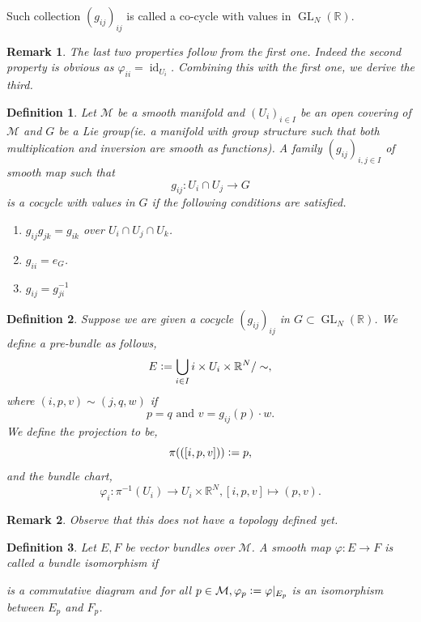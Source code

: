 \documentclass[8pt]{article}
\newtheorem{definition}{Definition}[section]
\newtheorem{remark}{Remark}[section]
\DeclareMathOperator{\GL}{GL}
\DeclareMathOperator{\id}{id}
\newcommand{\defeq}{\vcentcolon=}
\newcommand{\R}[0]{\mathbb{R}}
\newcommand{\M}[0]{\mathcal{M}}
\begin{document}
  Such collection $(g_{ij})_{ij}$ is called a co-cycle with values in $\GL_N(\R)$.
  \begin{remark}
    The last two properties follow from the first one. Indeed the second property is obvious as $\varphi_{ii} = \id_{U_i}$. Combining this with the first one, we derive the third.
  \end{remark}
  \begin{definition}
    Let $\M$ be a smooth manifold and $(U_i)_{i\in I}$ be an open covering of $\M$ and $G$ be a Lie group(ie. a manifold with group structure such that both multiplication and inversion are smooth as functions). A family $(g_{ij})_{i,j\in I}$ of smooth map such that 
    \begin{equation*}
      g_{ij}:U_i\cap U_j\to G
    \end{equation*}
    is a cocycle with values in $G$ if the following conditions are satisfied.
    \begin{enumerate}
      \item $g_{ij}g_{jk} = g_{ik}$ over $U_i\cap U_j\cap U_k$.
      \item $g_{ii} = e_G$.
      \item $g_{ij} = g_{ji}^{-1}$
    \end{enumerate}
  \end{definition}
  \begin{definition}
  Suppose we are given a cocycle $(g_{ij})_{ij}$ in $G\subset\GL_N(\R)$. We define a pre-bundle as follows,
  \begin{equation*}
    E \defeq \bigcup_{i\in I}{i}\times U_i\times \R^N/\sim,
  \end{equation*}
  where $(i,p,v)\sim(j,q,w)$ if 
  \begin{equation*}
    p=q\text{ and } v = g_{ij}(p)\cdot w.
  \end{equation*}
  We define the projection to be,
  \begin{equation*}
    \pi(([i,p,v]))\defeq p,
  \end{equation*}
  and the bundle chart,
  \begin{equation*}  
    \varphi_i:\pi^{-1}(U_i)\to U_i\times\R^N,[i,p,v]\mapsto (p,v).
  \end{equation*}
  \end{definition}
  \begin{remark}
    Observe that this does not have a topology defined yet.
  \end{remark}
  \begin{definition}
    Let $E,F$ be vector bundles over $\M$. A smooth map $\varphi:E\to F$ is called a bundle isomorphism if
    \begin{center}
    \end{center}
    is a commutative diagram and for all $p\in\M,\varphi_p\defeq\varphi|_{E_p}$ is an isomorphism between $E_p$ and $F_p$.
  \end{definition}
\end{document}
